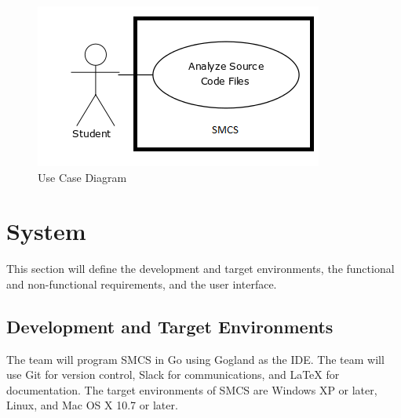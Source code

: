 \documentclass{scrreprt}
\begin{document}
	\begin{figure}[h]
		\centering
		\includegraphics{use-case-diagram-v2.png}
		\caption{Use Case Diagram}
	\end{figure}
	\chapter{System}
	This section will define the development and target environments, the functional and non-functional requirements, and the user interface.
	\section{Development and Target Environments}
	The team will program SMCS in Go using Gogland as the IDE. The team will use Git for version control, Slack for communications, and LaTeX for documentation.
	The target environments of SMCS are Windows XP or later, Linux, and Mac OS X 10.7 or later.
\end{document}
